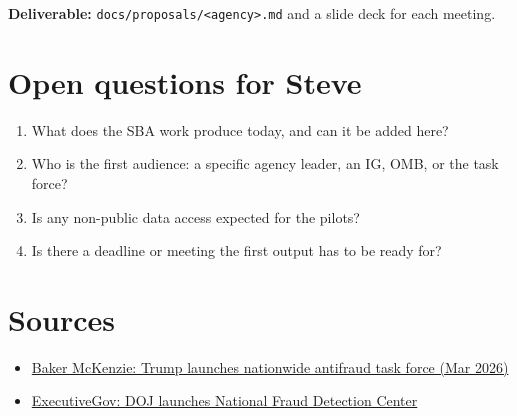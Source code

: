 \documentclass[letterpaper,11pt]{article}
\providecommand{\tightlist}{\setlength{\itemsep}{0pt}\setlength{\parskip}{0pt}}
\begin{document}
\textbf{Deliverable:}
\texttt{docs/proposals/\textless{}agency\textgreater{}.md} and a slide
deck for each meeting.

\hypertarget{open-questions-for-steve}{%
\section{Open questions for Steve}\label{open-questions-for-steve}}

\begin{enumerate}
\def\labelenumi{\arabic{enumi}.}
\tightlist
\item
  What does the SBA work produce today, and can it be added here?
\item
  Who is the first audience: a specific agency leader, an IG, OMB, or
  the task force?
\item
  Is any non-public data access expected for the pilots?
\item
  Is there a deadline or meeting the first output has to be ready for?
\end{enumerate}

\hypertarget{sources}{%
\section{Sources}\label{sources}}

\begin{itemize}
\tightlist
\item
  \href{https://www.bakermckenzie.com/en/insight/publications/2026/03/united-states-trump-launches-nationwide-antifraud-task-force}{Baker
  McKenzie: Trump launches nationwide antifraud task force (Mar 2026)}
\item
  \href{https://www.executivegov.com/articles/doj-national-fraud-detection-center}{ExecutiveGov:
  DOJ launches National Fraud Detection Center}
\end{itemize}
\end{document}
